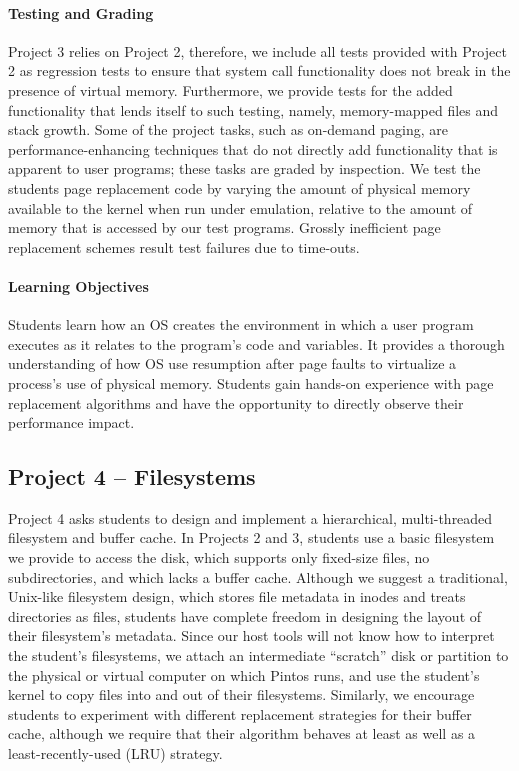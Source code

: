 \paragraph{Testing and Grading}
Project 3 relies on Project 2, therefore, we include all tests provided with Project 2
as regression tests to ensure that system call functionality does not break in the
presence of virtual memory.  Furthermore, we provide tests for the
added functionality that lends itself to such testing, namely, memory-mapped files
and stack growth.  Some of the project tasks, such as on-demand paging, are 
performance-enhancing techniques that do not directly add functionality that is
apparent to user programs; these tasks are graded by inspection.  We test the students
page replacement code by varying the amount of physical memory available to
the kernel when run under emulation, relative to the amount of memory that is 
accessed by our test programs.  
Grossly inefficient page replacement schemes result test failures due to time-outs.

\paragraph{Learning Objectives}
Students learn how an OS creates the environment in which a user
program executes as it relates to the program's code and variables.
It provides a thorough understanding of how OS use resumption after page faults
to virtualize a process's use of physical memory.
Students gain hands-on experience with page replacement algorithms
and have the opportunity to directly observe their performance impact. 

%
%
%
\subsection{Project 4 -- Filesystems}
Project 4 asks students to design and implement a hierarchical, multi-threaded
filesystem and buffer cache.  In Projects 2 and 3, students use a basic filesystem
we provide to access the disk, which supports only fixed-size files, no subdirectories,
and which lacks a buffer cache.  
Although we suggest a traditional, Unix-like filesystem design, which stores file
metadata in inodes and treats directories as files, students have
complete freedom in designing the layout of their filesystem's metadata.
Since our host tools will not know how to interpret the student's filesystems,
we attach an intermediate ``scratch'' disk or partition to the 
physical or virtual computer on which Pintos runs, and use the student's kernel
to copy files into and out of their filesystems.
Similarly, we encourage students to experiment with different replacement
strategies for their buffer cache, although we require that their algorithm
behaves at least as well as a least-recently-used (LRU) strategy.

